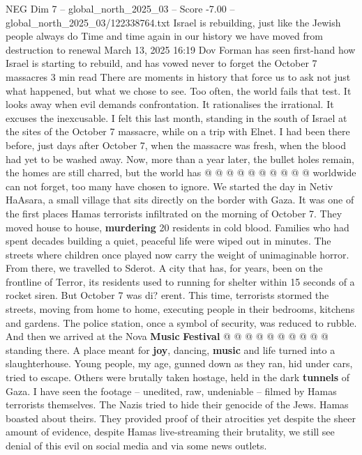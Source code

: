 \begin{textsample}{NEG Dim 7 – global\_north\_2025\_03 – Score -7.00 – global\_north\_2025\_03/122338764.txt}  \label{ex:f7_neg_129}
Israel is rebuilding, just like the Jewish people always do Time and time again in our history we have moved from destruction to renewal March 13, 2025 16:19 Dov Forman has seen first-hand how Israel is starting to rebuild, and has vowed never to forget the October 7 massacres 3 min read There are moments in history that force us to ask not just what happened, but what we chose to see.
Too often, the world fails that test.
It looks away when evil demands confrontation.
It rationalises the irrational.
It excuses the inexcusable.
I felt this last month, standing in the south of Israel at the sites of the October 7 massacre, while on a trip with Elnet.
I had been there before, just days after October 7, when the massacre was fresh, when the blood had yet to be washed away.
Now, more than a year later, the bullet holes remain, the homes are still charred, but the world has @ @ @ @ @ @ @ @ @ @ worldwide can not forget, too many have chosen to ignore.
We started the day in Netiv HaAsara, a small village that sits directly on the border with Gaza.
It was one of the first places Hamas terrorists infiltrated on the morning of October 7.
They moved house to house, \textbf{murdering} 20 residents in cold blood.
Families who had spent decades building a quiet, peaceful life were wiped out in minutes.
The streets where children once played now carry the weight of unimaginable horror.
From there, we travelled to Sderot.
A city that has, for years, been on the frontline of Terror, its residents used to running for shelter within 15 seconds of a rocket siren.
But October 7 was di? erent.
This time, terrorists stormed the streets, moving from home to home, executing people in their bedrooms, kitchens and gardens.
The police station, once a symbol of security, was reduced to rubble.
And then we arrived at the Nova \textbf{Music} \textbf{Festival} @ @ @ @ @ @ @ @ @ @ standing there.
A place meant for \textbf{joy}, dancing, \textbf{music} and life turned into a slaughterhouse.
Young people, my age, gunned down as they ran, hid under cars, tried to escape.
Others were brutally taken hostage, held in the dark \textbf{tunnels} of Gaza.
I have seen the footage -- unedited, raw, undeniable -- filmed by Hamas terrorists themselves.
The Nazis tried to hide their genocide of the Jews.
Hamas boasted about theirs.
They provided proof of their atrocities yet despite the sheer amount of evidence, despite Hamas live-streaming their brutality, we still see denial of this evil on social media and via some news outlets.

\end{textsample}
